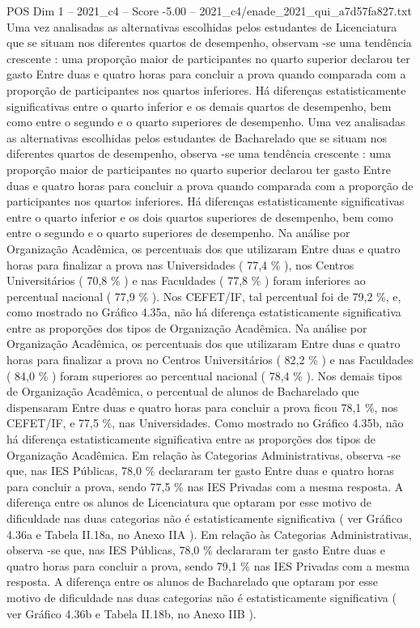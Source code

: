 \begin{textsample}{POS Dim 1 – 2021\_c4 – Score -5.00 – 2021\_c4/enade\_2021\_qui\_a7d57fa827.txt}
Uma vez analisadas as alternativas escolhidas pelos estudantes de Licenciatura que se situam nos diferentes quartos de desempenho, observam -se uma tendência crescente : uma proporção maior de participantes no quarto superior declarou ter gasto Entre duas e quatro horas para concluir a prova quando comparada com a proporção de participantes nos quartos inferiores.
Há diferenças estatisticamente significativas entre o quarto inferior e os demais quartos de desempenho, bem como entre o segundo e o quarto superiores de desempenho.
Uma vez analisadas as alternativas escolhidas pelos estudantes de Bacharelado que se situam nos diferentes quartos de desempenho, observa -se uma tendência crescente : uma proporção maior de participantes no quarto superior declarou ter gasto Entre duas e quatro horas para concluir a prova quando comparada com a proporção de participantes nos quartos inferiores.
Há diferenças estatisticamente significativas entre o quarto inferior e os dois quartos superiores de desempenho, bem como entre o segundo e o quarto superiores de desempenho.
Na análise por Organização Acadêmica, os percentuais dos que utilizaram Entre duas e quatro horas para finalizar a prova nas Universidades ( 77,4 \% ), nos Centros Universitários ( 70,8 \% ) e nas Faculdades ( 77,8 \% ) foram inferiores ao percentual nacional ( 77,9 \% ).
Nos CEFET/IF, tal percentual foi de 79,2 \%, e, como mostrado no Gráfico 4.35a, não há diferença estatisticamente significativa entre as proporções dos tipos de Organização Acadêmica.
Na análise por Organização Acadêmica, os percentuais dos que utilizaram Entre duas e quatro horas para finalizar a prova no Centros Universitários ( 82,2 \% ) e nas Faculdades ( 84,0 \% ) foram superiores ao percentual nacional ( 78,4 \% ).
Nos demais tipos de Organização Acadêmica, o percentual de alunos de Bacharelado que dispensaram Entre duas e quatro horas para concluir a prova ficou 78,1 \%, nos CEFET/IF, e 77,5 \%, nas Universidades.
Como mostrado no Gráfico 4.35b, não há diferença estatisticamente significativa entre as proporções dos tipos de Organização Acadêmica.
Em relação às Categorias Administrativas, observa -se que, nas IES Públicas, 78,0 \% declararam ter gasto Entre duas e quatro horas para concluir a prova, sendo 77,5 \% nas IES Privadas com a mesma resposta.
A diferença entre os alunos de Licenciatura que optaram por esse motivo de dificuldade nas duas categorias não é estatisticamente significativa ( ver Gráfico 4.36a e Tabela II.18a, no Anexo IIA ).
Em relação às Categorias Administrativas, observa -se que, nas IES Públicas, 78,0 \% declararam ter gasto Entre duas e quatro horas para concluir a prova, sendo 79,1 \% nas IES Privadas com a mesma resposta.
A diferença entre os alunos de Bacharelado que optaram por esse motivo de dificuldade nas duas categorias não é estatisticamente significativa ( ver Gráfico 4.36b e Tabela II.18b, no Anexo IIB ).

\end{textsample}
